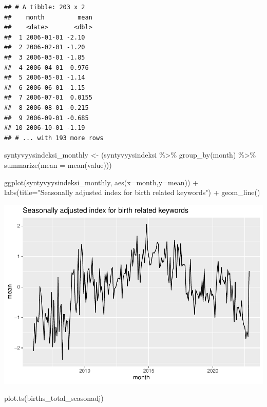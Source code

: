 \documentclass[
]{article}
\newenvironment{Shaded}{\begin{snugshade}}{\end{snugshade}}
\newcommand{\AttributeTok}[1]{\textcolor[rgb]{0.77,0.63,0.00}{#1}}
\newcommand{\FunctionTok}[1]{\textcolor[rgb]{0.00,0.00,0.00}{#1}}
\newcommand{\NormalTok}[1]{#1}
\newcommand{\OtherTok}[1]{\textcolor[rgb]{0.56,0.35,0.01}{#1}}
\newcommand{\SpecialCharTok}[1]{\textcolor[rgb]{0.00,0.00,0.00}{#1}}
\newcommand{\StringTok}[1]{\textcolor[rgb]{0.31,0.60,0.02}{#1}}
\begin{document}
\begin{verbatim}
## # A tibble: 203 x 2
##    month         mean
##    <date>       <dbl>
##  1 2006-01-01 -2.10  
##  2 2006-02-01 -1.20  
##  3 2006-03-01 -1.85  
##  4 2006-04-01 -0.976 
##  5 2006-05-01 -1.14  
##  6 2006-06-01 -1.15  
##  7 2006-07-01  0.0155
##  8 2006-08-01 -0.215 
##  9 2006-09-01 -0.685 
## 10 2006-10-01 -1.19  
## # ... with 193 more rows
\end{verbatim}

\begin{Shaded}
\begin{Highlighting}[]
\NormalTok{syntyvyysindeksi\_monthly }\OtherTok{\textless{}{-}}\NormalTok{ (syntyvyysindeksi }\SpecialCharTok{\%\textgreater{}\%} \FunctionTok{group\_by}\NormalTok{(month) }\SpecialCharTok{\%\textgreater{}\%} \FunctionTok{summarize}\NormalTok{(}\AttributeTok{mean =} \FunctionTok{mean}\NormalTok{(value)))}

\FunctionTok{ggplot}\NormalTok{(syntyvyysindeksi\_monthly, }\FunctionTok{aes}\NormalTok{(}\AttributeTok{x=}\NormalTok{month,}\AttributeTok{y=}\NormalTok{mean)) }\SpecialCharTok{+} \FunctionTok{labs}\NormalTok{(}\AttributeTok{title=}\StringTok{"Seasonally adjusted index for birth related keywords"}\NormalTok{) }\SpecialCharTok{+} \FunctionTok{geom\_line}\NormalTok{()}
\end{Highlighting}
\end{Shaded}

\includegraphics{GoogleTrendsMarkdown_files/figure-latex/unnamed-chunk-10-1.pdf}

\begin{Shaded}
\begin{Highlighting}[]
\FunctionTok{plot.ts}\NormalTok{(births\_total\_seasonadj)}
\end{Highlighting}
\end{Shaded}
\end{document}
